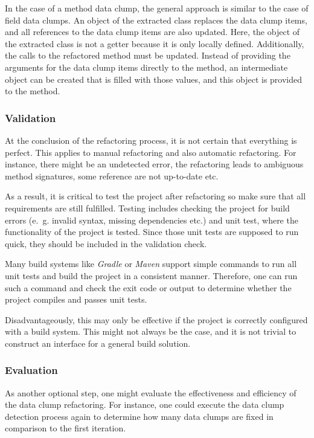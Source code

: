 In the case of a method data clump, the general approach is similar to the case of field data clumps. An object of the extracted class replaces the data clump items, and all references to the data clump items are also updated. Here, the object of the extracted class is not a getter because it is only locally defined. Additionally, the calls to the refactored method must be updated. Instead of providing the arguments for the data clump items directly to the method, an intermediate object can be created that is filled with those values, and this object is provided to the method. 

\subsubsection{Validation}

At the conclusion of the refactoring process, it is not certain that everything is perfect. This applies to manual refactoring and also automatic refactoring. For instance, there might be an undetected error, the refactoring leads to ambiguous method signatures, some reference are not up-to-date etc.

As a result, it is critical to test the project after refactoring so make sure that all requirements are still fulfilled. Testing includes checking the project for build errors (e.~g. invalid syntax, missing dependencies etc.) and unit test, where the functionality of the project is tested. Since those unit tests are supposed to run quick, they should be included in the validation check. 

Many build systems like \textit{Gradle} or \textit{Maven} support simple commands to run all unit tests and build the project in a consistent manner.  Therefore, one can run such a command and check the exit code or output to determine whether the project compiles and passes unit tests.

Disadvantageously, this may only be effective if the project is correctly configured with a build system. This might not always be the case, and it is not trivial to construct an interface for a general build solution. 

\subsubsection{Evaluation}

As another optional step, one might evaluate the effectiveness and efficiency of the data clump refactoring. For instance, one could execute the data clump detection process again to determine how many data clumps are fixed in comparison to the first iteration. 

